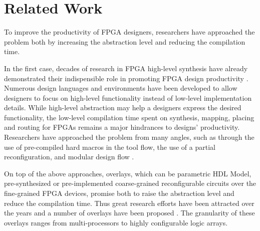 \section{Related Work}\label{sec:relatedwork}
To improve the productivity of FPGA designers, researchers have approached the problem both by increasing the abstraction level and reducing the compilation time.

In the first case, decades of research in FPGA high-level synthesis have already demonstrated their indispensible role in promoting FPGA design productivity \cite{cong2011high}. Numerous design languages and environments \cite{cardoso2010compiling} have been developed to allow designers to focus on high-level functionality instead of low-level implementation details. While high-level abstraction may help a designers express the desired functionality, the low-level compilation time spent on synthesis, mapping, placing and routing for FPGAs remains a major hindrances to designs' productivity. Researchers have approached the problem from many angles, such as through the use of pre-compiled hard macros \cite{lavin2011} in the tool flow, the use of a partial reconfiguration, and modular design flow \cite{Frangieh2010}. 

On top of the above approaches, overlays, which can be parametric HDL Model, pre-synthesized or pre-implemented coarse-grained reconfigurable circuits over the fine-grained FPGA devices, promise both to raise the abstraction level and reduce the compilation time. Thus great research efforts have been attracted over the years and a number of overlays have been proposed \cite{Lebedev2010,kissler2006dynamically,unnikrishnan2009application,Yiannacouras2009FPS,Guy2012VENICE,Jeffrey2011potential}. The granularity of these overlays ranges from multi-processors to highly configurable logic arrays. 

